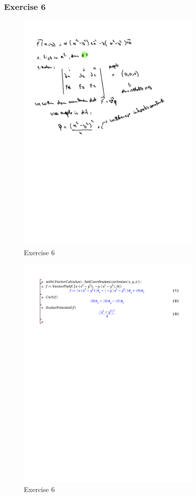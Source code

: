 \documentclass[a4paper]{report}
\begin{document}
\subsubsection{Exercise 6}

\begin{figure}[H]
	\centering
	\includegraphics[width=0.8\textwidth]{assets/huis_6_ex_6.pdf}
	\caption{Exercise 6}
	\label{fig:huis_6_ex_6}
\end{figure}

\begin{figure}[H]
	\centering
	\includegraphics[width=0.8\textwidth]{exercises/huis_6_ex_6.pdf}
	\caption{Exercise 6}
	\label{fig:huis_6_ex_6_maple}
\end{figure}
\end{document}
